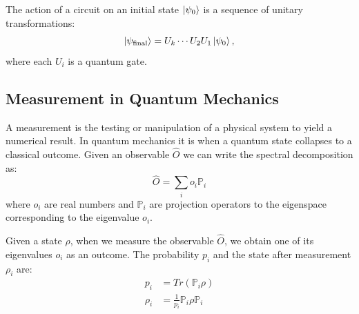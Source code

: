 \documentclass[encoding=utf8,british]{tumphthesis}
\begin{document}
        The action of a circuit on an initial state $\left|\psi_0\right>$ is a sequence of unitary transformations:
        \[
        \left|\psi_{\text{final}}\right> = U_k \cdots U_2 U_1 \left|\psi_0\right>,
        \]
        where each $U_i$ is a quantum gate.

        \subsection{Measurement in Quantum Mechanics}

        A measurement is the testing or manipulation of a physical system to yield a numerical result. In quantum mechanics it is when 
        a quantum state collapses to a classical outcome.
        Given an observable $\hat{O}$ we can write the spectral decomposition as:
        \begin{equation*}
            \hat{O} = \sum_i o_i \mathbb{P}_i
        \end{equation*}
        where $o_i$ are real numbers and $\mathbb{P}_i$ are projection operators to the eigenspace corresponding to the eigenvalue $o_i$. 
        
        Given a state $\rho$, when we measure the observable $\hat{O}$, we obtain one of its eigenvalues $o_i$ as an outcome.
        The probability $p_i$ and the state after measurement $\rho_i$ are:
        \begin{align*}
            p_i &= Tr(\mathbb{P}_i \rho)
            \\
            \rho_i &= \frac{1}{p_i}\mathbb{P}_i \rho \mathbb{P}_i
        \end{align*}
\end{document}
